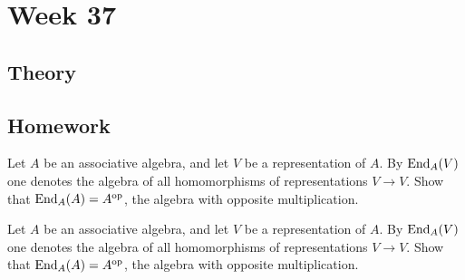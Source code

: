 \section{Week 37}

\subsection*{Theory}

\subsection*{Homework}

\begin{thm}
Let \(A\) be an associative algebra, and let \(V\) be a representation of \(A\). By \(\operatorname{End}_{A} (V)\) one denotes the algebra of all homomorphisms of representations \(V\rightarrow V\). Show that \(\operatorname{End}_{A} (A)= A^{\text{op}}\), the algebra with opposite multiplication.
\end{thm}


\begin{thm}
Let \(A\) be an associative algebra, and let \(V\) be a representation of \(A\). By \(\operatorname{End}_{A} (V)\) one denotes the algebra of all homomorphisms of representations \(V\rightarrow V\). Show that \(\operatorname{End}_{A} (A)= A^{\text{op}}\), the algebra with opposite multiplication.
\end{thm}

